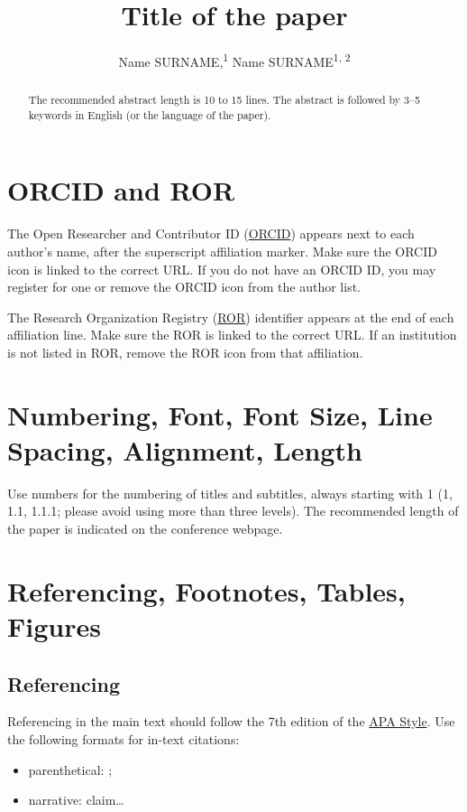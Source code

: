 \documentclass{article}
\title{Title of the paper}
\author{
  Name SURNAME,\textsuperscript{1}\orcidlink{0000-0000-0000-0000} Name SURNAME\textsuperscript{1, 2}\orcidlink{0000-0000-0000-0001}
}
\begin{document}
\maketitle



\begin{abstract}
The recommended abstract length is 10 to 15 lines. The abstract is followed by 3--5 keywords in English (or the language of the paper).
\end{abstract}

\section{ORCID and ROR}

The Open Researcher and Contributor ID (\href{https://orcid.org/}{ORCID}) appears next to each author’s name, after the superscript affiliation marker. Make sure the ORCID icon is linked to the correct URL. If you do not have an ORCID ID, you may register for one or remove the ORCID icon from the author list.

The Research Organization Registry (\href{https://ror.org/}{ROR}) identifier appears at the end of each affiliation line. Make sure the ROR is linked to the correct URL. If an institution is not listed in ROR, remove the ROR icon from that affiliation.


\section{Numbering, Font, Font Size, Line Spacing, Alignment, Length}

Use numbers for the numbering of titles and subtitles, always starting with 1 (1, 1.1, 1.1.1; please avoid using more than three levels). The recommended length of the paper is indicated on the conference webpage.

\section{Referencing, Footnotes, Tables, Figures}

\subsection{Referencing}
 
Referencing in the main text should follow the 7th edition of the \href{https://apastyle.apa.org/}{APA Style}. 
Use the following formats for in-text citations:
\begin{itemize}
    \item parenthetical: \parencite{leech1992corpora};
    \item narrative: \textcite{biber1998corpus} claim\ldots{}
\end{itemize}
 
\end{document}
